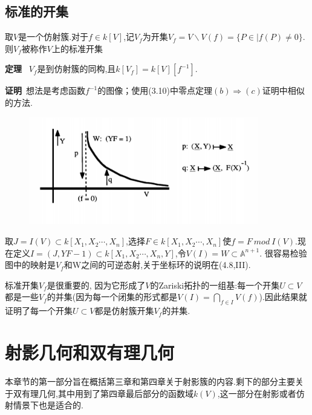 \documentclass[UTF8]{book}
\begin{document}
	\section{标准的开集}
		取$ V $是一个仿射簇.对于$ f \in k[V] $,记$ V_{f} $为开集$ V_{f} = V \backslash V(f) = \{P\in|f(P) \neq 0 \} $.则$ V_{f} $被称作$ V $上的标准开集

		\textbf{定理} \ $V_{f}$是到仿射簇的同构,且$k[V_{f}]=k[V][f^{-1}].$

		\textbf{证明}\ 想法是考虑函数$f^{-1}$的图像；使用(3.10)中零点定理$(b)\Rightarrow(c)$证明中相似的方法.
		\begin{figure}[h]
		  \centering
		  \includegraphics[width=10cm]{75.jpg}\\
		\end{figure}

		取$J=I(V)\subset k[X_{1},X_{2}\cdots,X_{n}]$,选择$F\in k[X_{1},X_{2}\cdots,X_{n}]$使$f=F \ mod \ I(V)$.现在定义$I=(J,YF-1)\subset k[X_{1},X_{2}\cdots,X_{n},Y]$,令$V(I)=W\subset \mathbb{A}^{n+1}.$
		很容易检验图中的映射是$V_{f}$和W之间的可逆态射,关于坐标环的说明在(4.8,III).

		标准开集$V_{f}$是很重要的, 因为它形成了$ V $的Zariski拓扑的一组基:每一个开集$U\subset V$都是一些$V_{f}$的并集(因为每一个闭集的形式都是$V(I)=\bigcap_{f \in I} V(f)$).因此结果就证明了每一个开集$U\subset V$都是仿射簇开集$V_{f}$的并集.



\chapter{射影几何和双有理几何}
	本章节的第一部分旨在概括第三章和第四章关于射影簇的内容.剩下的部分主要关于双有理几何,其中用到了第四章最后部分的函数域$ k(V) $,这一部分在射影或者仿射情景下也是适合的.
	
	\setcounter{section}{-1}
\end{document}
